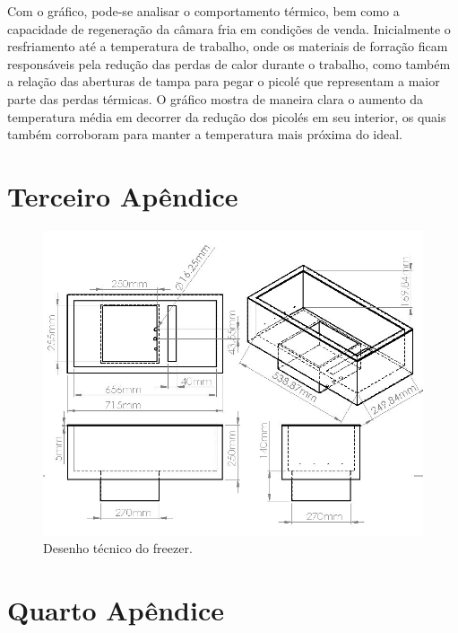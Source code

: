 \begin{apendicesenv}
	Com o gráfico, pode-se analisar o comportamento térmico, bem como a capacidade de regeneração da câmara fria em condições de venda. Inicialmente o resfriamento até a temperatura de trabalho, onde os materiais de forração ficam responsáveis pela redução das perdas de calor durante o trabalho, como também a relação das aberturas de tampa para pegar o picolé que representam a maior parte das perdas térmicas. O gráfico mostra de maneira clara o aumento da temperatura média em decorrer da redução dos picolés em seu interior, os quais também corroboram para manter a temperatura mais próxima do ideal.

\chapter{Terceiro Apêndice}
\label{app:freezer}

\begin{figure}[H]
\centering
\includegraphics[width=\textwidth]{figuras/desenho_tecnico_freezer}
\caption{Desenho técnico do freezer.}
\label{fig:desenho_freezer}
\end{figure}

\newpage
\chapter{Quarto Apêndice}


\end{apendicesenv}
